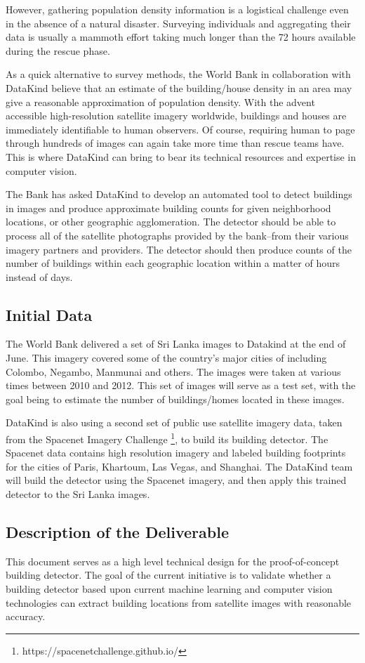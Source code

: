 \documentclass[12pt, a4paper, oneside, headinclude, footinclude]{article}
\begin{document}
However, gathering population density information is a logistical challenge even in the absence of a natural disaster. Surveying individuals and aggregating their data is usually a mammoth effort taking much longer than the 72 hours available during the rescue phase. 

As a quick alternative to survey methods, the World Bank in collaboration with DataKind believe that an estimate of the building/house density in an area may give a reasonable approximation of population density. With the advent accessible high-resolution satellite imagery worldwide, buildings and houses are immediately identifiable to human observers. Of course, requiring human to page through hundreds of images can again take more time than rescue teams have. This is where DataKind can bring to bear its technical resources and expertise in computer vision. 

The Bank has asked DataKind to develop an automated tool to detect buildings in images and produce approximate building counts for given neighborhood locations, or other geographic agglomeration. The detector should be able to process all of the satellite photographs provided by the bank--from their various imagery partners and providers. The detector should then produce counts of the number of buildings within each geographic location within a matter of hours instead of days. 

\subsection{Initial Data}
The World Bank delivered a set of Sri Lanka images to Datakind at the end of June. This imagery covered some of the country’s major cities of including Colombo, Negambo, Manmunai and others. The images were taken at various times between 2010 and 2012. This set of images will serve as a test set, with the goal being to estimate the number of buildings/homes located in these images. 

DataKind is also using a second set of public use satellite imagery data, taken from the Spacenet Imagery Challenge \footnote{https://spacenetchallenge.github.io/}, to build its building detector. The Spacenet data contains high resolution imagery and labeled building footprints for the cities of Paris, Khartoum, Las Vegas, and Shanghai. The DataKind team will build the detector using the Spacenet imagery, and then apply this trained detector to the Sri Lanka images. 

\subsection{Description of the Deliverable}
This document serves as a high level technical design for the proof-of-concept building detector. The goal of the current initiative is to validate whether a building detector based upon current machine learning and computer vision technologies can extract building locations from satellite images with reasonable accuracy. 
\end{document}
